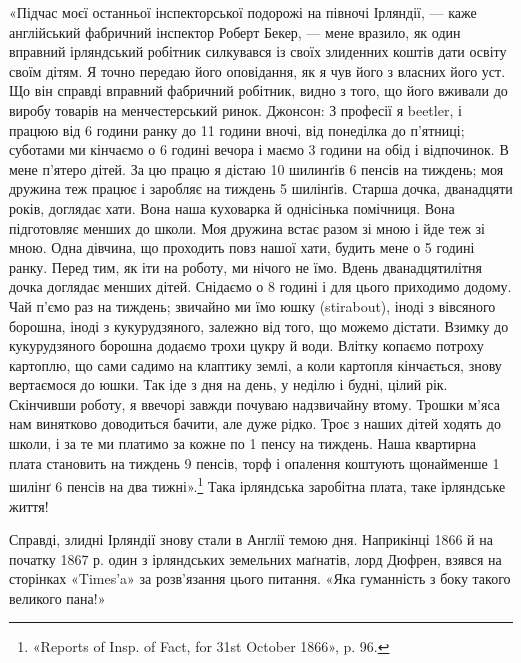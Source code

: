 «Підчас моєї останньої інспекторської подорожі на півночі
Ірляндії, — каже англійський фабричний інспектор Роберт Бекер,
— мене вразило, як один вправний ірляндський робітник
силкувався із своїх злиденних коштів дати освіту своїм дітям.
Я точно передаю його оповідання, як я чув його з власних його
уст. Що він справді вправний фабричний робітник, видно з того,
що його вживали до виробу товарів на менчестерський ринок.
Джонсон: З професії я beetler, і працюю від 6 години ранку до
11 години вночі, від понеділка до п’ятниці; суботами ми кінчаємо
о 6 годині вечора і маємо 3 години на обід і відпочинок. В мене
п’ятеро дітей. За цю працю я дістаю 10 шилинґів 6 пенсів на тиждень;
моя дружина теж працює і заробляє на тиждень 5 шилінґів.
Старша дочка, дванадцяти років, доглядає хати. Вона наша
куховарка й однісінька помічниця. Вона підготовляє менших
до школи. Моя дружина встає разом зі мною і йде теж зі мною.
Одна дівчина, що проходить повз нашої хати, будить мене о 5
годині ранку. Перед тим, як іти на роботу, ми нічого не їмо.
Вдень дванадцятилітня дочка доглядає менших дітей. Снідаємо
о 8 годині і для цього приходимо додому. Чай п’ємо раз на тиждень;
звичайно ми їмо юшку (stirabout), іноді з вівсяного борошна,
іноді з кукурудзяного, залежно від того, що можемо дістати.
Взимку до кукурудзяного борошна додаємо трохи цукру й води.
Влітку копаємо потроху картоплю, що сами садимо на клаптику
землі, а коли картопля кінчається, знову вертаємося до юшки.
Так іде з дня на день, у неділю і будні, цілий рік. Скінчивши
роботу, я ввечорі завжди почуваю надзвичайну втому. Трошки
м’яса нам винятково доводиться бачити, але дуже рідко. Троє
з наших дітей ходять до школи, і за те ми платимо за кожне по
1 пенсу на тиждень. Наша квартирна плата становить на тиждень
9 пенсів, торф і опалення коштують щонайменше 1 шилінґ 6 пенсів
на два тижні».\footnote{
«Reports of Insp. of Fact, for 31st October 1866», p. 96.
} Така ірляндська заробітна плата, таке
ірляндське життя!

Справді, злидні Ірляндії знову стали в Англії темою дня.
Наприкінці 1866 й на початку 1867 р. один з ірляндських земельних
маґнатів, лорд Дюфрен, взявся на сторінках «Times’a» за
розв’язання цього питання. «Яка гуманність з боку такого великого
пана!»

